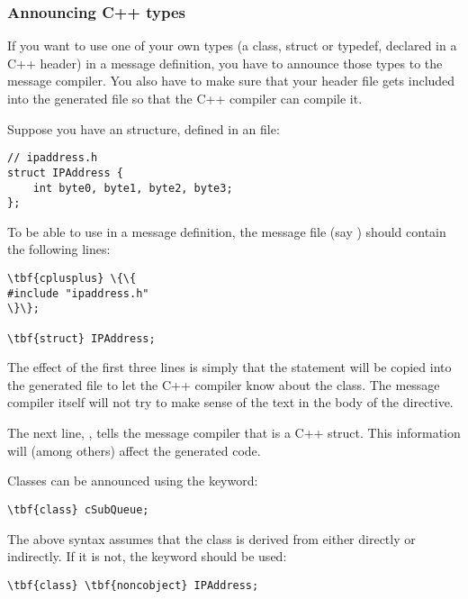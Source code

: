 \subsubsection{Announcing C++ types}

If you want to use one of your own types (a class, struct or typedef,
declared in a C++ header) in a message definition, you have to
announce those types to the message compiler. You also have to make sure
that your header file gets included into the generated  file
so that the C++ compiler can compile it.

Suppose you have an  structure, defined in an 
file:

\begin{verbatim}
// ipaddress.h
struct IPAddress {
    int byte0, byte1, byte2, byte3;
};
\end{verbatim}

To be able to use  in a message definition, the message
file (say ) should contain the following lines:

\begin{Verbatim}[commandchars=\\\{\}]
\tbf{cplusplus} \{\{
#include "ipaddress.h"
\}\};

\tbf{struct} IPAddress;
\end{Verbatim}

The effect of the first three lines is simply that the 
statement will be copied into the generated 
file to let the C++ compiler know about the  class.
The message compiler itself will not try to make sense of the
text in the body of the  directive.

The next line, , tells the message compiler that
 is a C++ struct. This information will (among others)
affect the generated code.

Classes can be announced using the  keyword:

\begin{Verbatim}[commandchars=\\\{\}]
\tbf{class} cSubQueue;
\end{Verbatim}

The above syntax assumes that the class is derived from 
either directly or indirectly. If it is not, the 
keyword should be used:

\begin{Verbatim}[commandchars=\\\{\}]
\tbf{class} \tbf{noncobject} IPAddress;
\end{Verbatim}

